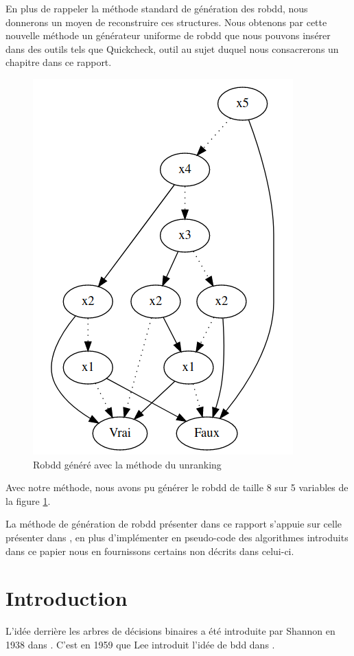 \documentclass[french]{article}
\begin{document}
En plus de rappeler la méthode standard de génération des robdd, nous donnerons un moyen de reconstruire ces structures. Nous obtenons par cette nouvelle méthode un générateur uniforme de robdd que nous pouvons insérer dans des outils tels que Quickcheck, outil au sujet duquel nous consacrerons un chapitre dans ce rapport. 

\begin{figure}[h!]
    \centering
    \includegraphics[scale=0.4]{robdd de presentation.png}
    \caption{Robdd généré avec la méthode du unranking}
    \label{fig:ROBDD2}
\end{figure}
\newpage
 Avec notre méthode, nous avons pu générer le robdd de taille 8 sur 5 variables de la figure \ref{fig:ROBDD2}.
 
 La méthode de génération de robdd présenter dans ce rapport s'appuie sur celle présenter dans \cite{genitrini}, en plus d'implémenter en pseudo-code des algorithmes introduits dans ce papier nous en fournissons certains non décrits dans celui-ci.



\section{Introduction}
L'idée derrière les arbres de décisions binaires a été introduite par Shannon en 1938 dans \cite{shannon}. C'est en 1959 que Lee introduit l'idée de bdd dans \cite{lee}.
\end{document}

